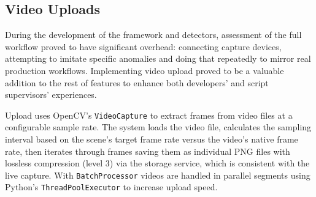 \subsection{Video Uploads}
During the development of the framework and detectors, assessment of the full workflow proved to have significant overhead: connecting capture devices, attempting to imitate specific anomalies and doing that repeatedly to mirror real production workflows. Implementing video upload proved to be a valuable addition to the rest of features to enhance both developers' and script supervisors' experiences. 

Upload uses OpenCV's \texttt{VideoCapture} to extract frames from video files at a configurable sample rate. The system loads the video file, calculates the sampling interval based on the scene's target frame rate versus the video's native frame rate, then iterates through frames saving them as individual PNG files with lossless compression (level 3) via the storage service, which is consistent with the live capture. With \texttt{BatchProcessor} videos are handled in parallel segments using Python's \texttt{ThreadPoolExecutor} to increase upload speed.